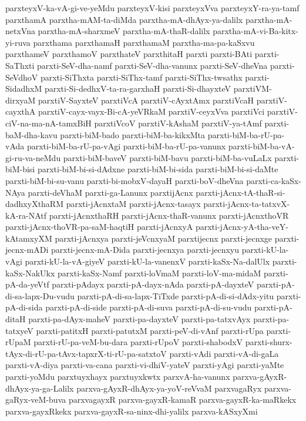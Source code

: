 {parxteyxV-ka-vA-gi-ve-yeMdu
parxteyxV-kisi
parxteyxVva
parxteyxY-ra-ya-tamf
parxthamA
parxtha-mAM-ta-diMda
parxtha-mA-dhAyx-ya-dalilx
parxtha-mA-netxVna
parxtha-mA-sharxmeV
parxtha-mA-thaR-dalilx
parxtha-mA-vi-Ba-kitx-yi-ruva
parxthama
parxthamaH
parxthamaM
parxtha-ma-pa-kaSxvu
parxthameV
parxthamoV
parxthateV
parxthitaH
parxti
parxti-BAti
parxti-SaThxti
parxti-SeV-dha-namf
parxti-SeV-dha-vanunx
parxti-SeV-dheVna
parxti-SeVdhoV
parxti-SiThxta
parxti-SiThx-tamf
parxti-SiThx-twsathx
parxti-SidadhxM
parxti-Si-dedhxV-ta-ra-garxhaH
parxti-Si-dhayxteV
parxtiVM-dirxyaM
parxtiV-SayxteV
parxtiVcA
parxtiV-cAyxtAmx
parxtiVcaH
parxtiV-cayxthA
parxtiV-cayx-vayx-Bi-cA-yeVRkaM
parxtiV-ceyxVva
parxtiVci
parxtiV-ciV-na-ma-nA-tamxBiH
parxtiVcoV
parxtiV-kAshaM
parxtiV-ya-tAmf
parxti-baM-dha-kavu
parxti-biM-bado
parxti-biM-ba-kikxMta
parxti-biM-ba-rU-pa-vAda
parxti-biM-ba-rU-pa-vAgi
parxti-biM-ba-rU-pa-vanunx
parxti-biM-ba-vA-gi-ru-va-neMdu
parxti-biM-baveV
parxti-biM-bavu
parxti-biM-ba-vuLaLx
parxti-biM-bisi
parxti-biM-bi-si-dAdxne
parxti-biM-bi-sida
parxti-biM-bi-si-daMte
parxti-biM-bi-su-vanu
parxti-bi-mobxV-dayaH
parxti-boV-dheVna
parxti-ca-kaSx-NAya
parxti-deVhaM
parxti-ga-Lanunx
parxtijAcnx
parxti-jAcnx-tA-thaR-si-dadhxyXthaRM
parxti-jAcnxtaM
parxti-jAcnx-tasayx
parxti-jAcnx-ta-tatxvX-kA-ra-NAtf
parxti-jAcnxthaRH
parxti-jAcnx-thaR-vanunx
parxti-jAcnxthoVR
parxti-jAcnx-thoVR-pa-saM-haqtiH
parxti-jAcnxyA
parxti-jAcnx-yA-tha-veY-kAtamxyXM
parxti-jAcnxya
parxti-jeVcnxyaM
parxtijecnx
parxti-jecnxge
parxti-jecnx-mADi
parxti-jecnx-mA-Dida
parxti-jecnxya
parxti-jecnxyu
parxti-kU-la-vAgi
parxti-kU-la-vA-giyeV
parxti-kU-la-vanenxV
parxti-kaSx-Na-dalUlx
parxti-kaSx-NakUkx
parxti-kaSx-Namf
parxti-loVmaM
parxti-loV-ma-midaM
parxti-pA-da-yeVtf
parxti-pAdayx
parxti-pA-dayx-nAda
parxti-pA-dayxteV
parxti-pA-di-sa-lapx-Du-vudu
parxti-pA-di-sa-lapx-TiTxde
parxti-pA-di-si-dAdx-yitu
parxti-pA-di-sida
parxti-pA-di-side
parxti-pA-di-suva
parxti-pA-di-su-vudu
parxti-pA-ditaH
parxti-pa-dAyx-maheV
parxti-pa-dayxteV
parxti-pa-tatxvAyx
parxti-pa-tatxyeV
parxti-patitxH
parxti-patutxM
parxti-peV-di-vAnf
parxti-rUpa
parxti-rUpaM
parxti-rU-pa-veM-bu-dara
parxti-rUpoV
parxti-shabodxV
parxti-shurx-tAyx-di-rU-pa-tAvx-tapxrX-ti-rU-pa-satxtoV
parxti-vAdi
parxti-vA-di-gaLa
parxti-vA-diya
parxti-va-cana
parxti-vi-dhiV-yateV
parxti-yAgi
parxti-yaMte
parxti-yoMdu
parxtuyxhayx
parxtuyxkwtx
parxvA-ha-vanunx
parxva-gAyxR-dhAyx-ya-ga-Lalilx
parxva-gAyxR-dhAyx-ya-yoV-reVvaM
parxvagaRyx
parxva-gaRyx-veM-buva
parxvagayxR
parxva-gayxR-kamaR
parxva-gayxR-ka-maRkekx
parxva-gayxRkekx
parxva-gayxR-sa-ninx-dhi-yalilx
parxva-kASxyXmi
}
